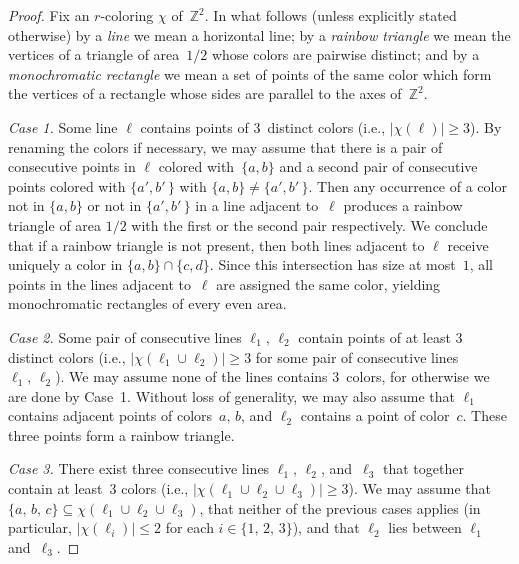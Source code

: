 \documentclass[10pt,a4paper]{amsart}
\newcommand{\Z}{\mbox{${\mathbb Z}$}}
\begin{document}
    \begin{proof}
      Fix an $r$-coloring $\chi$ of~$\Z^2\!$.
      In what follows (unless explicitly stated otherwise) by a \emph{ line} we mean a horizontal line;
      by a \emph{rainbow triangle} we mean the vertices of a triangle of area~$1/2$
      whose colors are pairwise distinct;
      and by a \emph{monochromatic rectangle} we
      mean a set of points of the same color which form the vertices of a rectangle
      whose sides are parallel to the axes of~$\Z^2\!$.

      \medskip
      \emph{Case 1.} Some line $\ell$ contains points of $3$~distinct colors
      (i.e., $\bigl|\chi(\ell)\bigr|\ge 3$).
      By renaming the colors if necessary, we may assume that there is a  pair  of consecutive points
      in $\ell$ colored with~$\{a,b\}$ and a second pair of consecutive points colored with  $\{a',b'\,\}$
with $\{a,b\}\neq \{a',b'\,\}$.
      Then any occurrence of a color not in $\{a,b\}$ or not in $\{a',b'\,\}$  in a line adjacent to~$\ell$
      produces a rainbow triangle of area $1/2$ with the first or the second pair respectively.
      We conclude that if a rainbow triangle is not present, then both lines adjacent to $\ell$ receive uniquely a color in $\{a,b\}\cap \{c,d\}$. Since this intersection has size at most~$1$, all points in the lines adjacent to~$\ell$ are assigned the same color, yielding monochromatic rectangles of every even area.

      \medskip
      \emph{Case 2.} Some pair of consecutive lines $\ell_1,\, \ell_2$ contain points of at least $3$ distinct
colors
      (i.e., $\bigl|\chi(\ell_1\cup\ell_2)\bigr|\ge 3$ for some pair of consecutive lines~$\ell_1,\,\ell_2$).
      We may assume none of the lines contains 3~colors, for otherwise we are done by Case~1.
      Without loss of generality, we may also assume that $\ell_1$ contains adjacent points of colors~$a,\,b$,
      and $\ell_2$ contains a point of color~$c$. These three points form a rainbow triangle.

      \medskip
      \emph{Case 3.} There exist three consecutive lines $\ell_1,\,\ell_2$, and~$\ell_3$ that
      together contain at least~$3$ colors
      (i.e., $\bigl|\chi(\ell_1\cup\ell_2\cup\ell_3)\bigr|\ge 3$).
      We may assume that $\{a,\,b,\,c\}\subseteq \chi(\ell_1\cup\ell_2\cup\ell_3)$, that neither
      of the previous cases applies (in particular, $\bigl|\chi(\ell_i)\bigr|\le 2$ for each $i\in\{1,\,2,\,3\}$),
      and that $\ell_2$ lies between $\ell_1$ and~$\ell_3$.


\end{proof}
\end{document}
